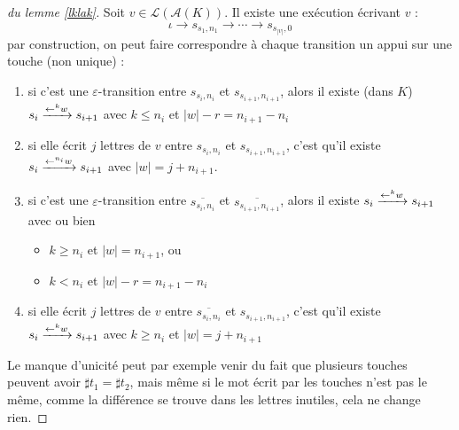 \documentclass[12pt, a4paper]{article}
\renewcommand{\L}{\mathcal{L}}
\renewcommand{\bar}{\overline}
\newcommand{\A}{\mathcal{A}}
\begin{document}
    \begin{proof}[du lemme \ref{lklak}]
       Soit $v \in \L(\A(K))$. Il existe une exécution écrivant $v$ :
       \[ \iota \rightarrow s_{s_1,n_1} \rightarrow \cdots \rightarrow s_{s_{|v|},0} \]
       par construction, on peut faire correspondre à chaque transition un appui sur une touche (non unique) :
       \begin{enumerate}
        \item si c'est une $\varepsilon$-transition entre $s_{s_i, n_i}$ et $s_{s_{i+1},n_{i+1}}$, alors il existe (dans $K$) $s_i \xrightarrow{\mathord{\leftarrow}^{k}w} s_{i+1}$ avec $k \leqslant n_i$ et $|w| - r = n_{i+1} - n_i$
        \item si elle écrit $j$ lettres de $v$ entre $s_{s_i,n_i}$ et $s_{s_{i+1},n_{i+1}}$, c'est qu'il existe $s_i \xrightarrow{\mathord{\leftarrow}^{n_i}w} s_{i+1}$ avec $|w| = j + n_{i+1}$.
        \item si c'est une $\varepsilon$-transition entre $\bar{s_{s_i, n_i}}$ et $\bar{s_{s_{i+1},n_{i+1}}}$, alors il existe $s_i \xrightarrow{\mathord{\leftarrow}^{k}w} s_{i+1}$ avec ou bien
            \begin{itemize}
                \item $k \geqslant n_i$ et $|w| = n_{i+1}$, ou
                \item $k < n_i$ et $|w| - r = n_{i+1} - n_i$
            \end{itemize}
        \item si elle écrit $j$ lettres de $v$ entre $\bar{s_{s_i,n_i}}$ et $s_{s_{i+1},n_{i+1}}$, c'est qu'il existe $s_i \xrightarrow{\mathord{\leftarrow}^{k}w} s_{i+1}$ avec $k \geqslant n_i$ et $|w| = j + n_{i+1}$
       \end{enumerate}
       Le manque d'unicité peut par exemple venir du fait que plusieurs touches peuvent avoir $\sharp t_1 = \sharp t_2$, mais même si le mot écrit par les touches n'est pas le même, comme la différence se trouve dans les lettres inutiles, cela ne change rien.


\end{proof}
\end{document}
